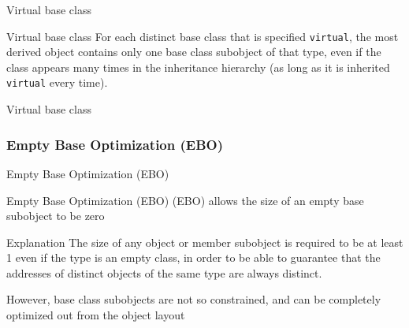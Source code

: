 \begin{frame}{Virtual base class}{}
  \begin{block}{Virtual base class}
    For each distinct base class that is specified \lstinline!virtual!, the most derived object contains only one base class subobject of that type, even if the class appears many times in the inheritance hierarchy (as long as it is inherited \lstinline!virtual! every time).
  \end{block}

  \begin{example}
    \begin{center}
    \end{center}
  \end{example}
\end{frame}

\begin{frame}{Virtual base class}{}
  \begin{example}
  \end{example}
\end{frame}



\subsubsection{Empty Base Optimization (EBO)}

\begin{frame}{Empty Base Optimization (EBO)}{}
  \begin{block}{Empty Base Optimization (EBO)}
     (EBO) allows the size of an empty base subobject to be zero
  \end{block}

  \begin{block}{Explanation}
    The size of any object or member subobject is required to be at least 1 even if the type is an empty class, in order to be able to guarantee that the addresses of distinct objects of the same type are always distinct.

    However, base class subobjects are not so constrained, and can be completely optimized out from the object layout
  \end{block}
\end{frame}


